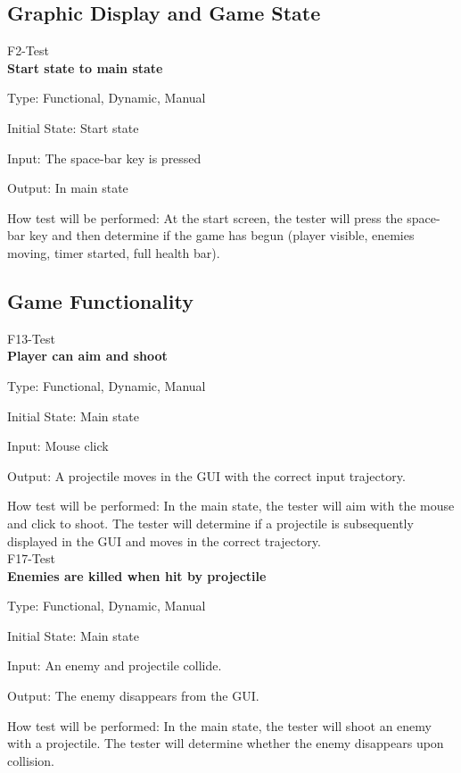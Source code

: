 \documentclass[12pt, titlepage]{article}
\begin{document}
\subsection{Graphic Display and Game State}

F2-Test \\
\textbf{Start state to main state}

\noindent Type: Functional, Dynamic, Manual
					
\noindent Initial State: Start state
					
\noindent Input: The space-bar key is pressed
					
\noindent Output: In main state
					
\noindent How test will be performed: At the start screen, the tester will press the space-bar key and then determine if the game has begun (player visible, enemies moving, timer started, full health bar).
		

\subsection{Game Functionality}
F13-Test \\
\textbf{Player can aim and shoot}

\noindent Type: Functional, Dynamic, Manual
					
\noindent Initial State: Main state
					
\noindent Input: Mouse click
					
\noindent Output: A projectile moves in the GUI with the correct input trajectory.
					
\noindent How test will be performed: In the main state, the tester will aim with the mouse and click to shoot.  The tester will determine if a projectile is subsequently displayed in the GUI and moves in the correct trajectory. \\

\noindent F17-Test \\
\textbf{Enemies are killed when hit by projectile}

\noindent Type: Functional, Dynamic, Manual
					
\noindent Initial State: Main state
					
\noindent Input: An enemy and projectile collide.
					
\noindent Output: The enemy disappears from the GUI.
					
\noindent How test will be performed: In the main state, the tester will shoot an enemy with a projectile.  The tester will determine whether the enemy disappears upon collision. \\
\end{document}
